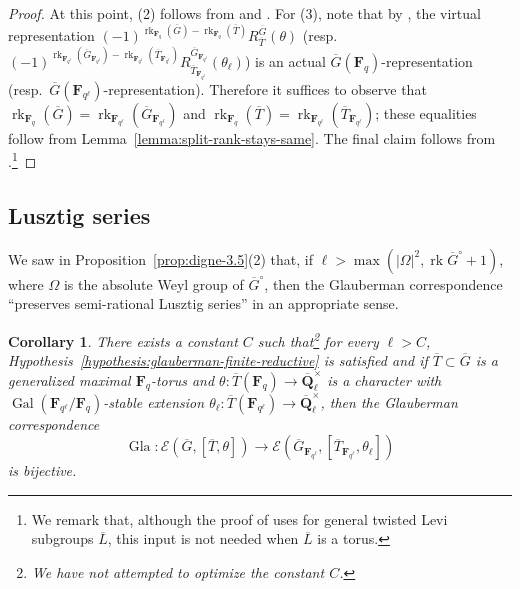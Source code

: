 \documentclass[reqno]{amsart}
\numberwithin{equation}{subsection}
\newcommand{\F}{\mathbf{F}}
\newcommand{\Q}{\mathbf{Q}}
\newcommand{\Gal}{\operatorname{Gal}}
\newcommand{\ol}[1]{\overline{#1}}
\newcommand{\co}{\colon}
\newcommand\cE{\mathcal{E}}
\DeclareMathOperator{\rk}{rk}
\DeclareMathOperator{\Gla}{Gla}
\newtheorem{cor}[thm]{Corollary}
\theoremstyle{remark}
\numberwithin{equation}{subsection}
\numberwithin{figure}{subsection}
\begin{document}
\begin{proof}
    At this point, (2) follows from \cite[Lemma 2.2]{Cot26a} and \cite[Corollaire 3.2]{Dig99}. For (3), note that by \cite[Proposition~7.4]{DL76}, the virtual representation $(-1)^{\rk_{\F_q}(\ol G) - \rk_{\F_q}(\ol T)}R_{\ol T}^{\ol G}(\theta)$ (resp.\ $(-1)^{\rk_{\F_{q^\ell}}(\ol G_{\F_{q^\ell}}) - \rk_{\F_{q^\ell}}(\ol T_{\F_{q^\ell}})} R_{\ol T_{\F_{q^\ell}}}^{\ol G_{\F_{q^\ell}}}(\theta_\ell)$) is an actual $\ol G(\F_q)$-representation (resp.\ $\ol G(\F_{q^\ell})$-representation). Therefore it suffices to observe that $\rk_{\F_q}(\ol G) = \rk_{\F_{q^\ell}}(\ol G_{\F_{q^\ell}})$ and $\rk_{\F_q}(\ol T) = \rk_{\F_{q^\ell}}(\ol T_{\F_{q^\ell}})$; these equalities follow from Lemma~\ref{lemma:split-rank-stays-same}. The final claim follows from \cite[Theorem 1.2]{Cot26a}.\footnote{We remark that, although the proof of \cite[Theorem 1.2]{Cot26a} uses \cite[Theorem~8.7.2]{GRV26} for general twisted Levi subgroups $\ol L$, this input is not needed when $\ol L$ is a torus.}
\end{proof}

\subsection{Lusztig series}\label{ssec:lusztig-series}

We saw in Proposition~\ref{prop:digne-3.5}(2) that, if $\ell > \max(|\Omega|^2, \rk \ol G^\circ + 1)$, where $\Omega$ is the absolute Weyl group of $\ol G^\circ$, then the Glauberman correspondence ``preserves semi-rational Lusztig series'' in an appropriate sense.

\begin{cor}\label{cor:glauberman-lusztig-bijection}
    There exists a constant $C$ such that\footnote{We have not attempted to optimize the constant $C$.} for every $\ell > C$, Hypothesis~\ref{hypothesis:glauberman-finite-reductive} is satisfied and if $\ol T \subset \ol G$ is a generalized maximal $\F_q$-torus and $\theta\co \ol T(\F_q) \to \ol\Q_\ell^\times$ is a character with $\Gal(\F_{q^\ell}/\F_q)$-stable extension $\theta_\ell\co \ol T(\F_{q^\ell}) \to \ol\Q_\ell^\times$, then the Glauberman correspondence
    \[
    \Gla\co \cE(\ol G, [\ol T, \theta]) \to \cE(\ol G_{\F_{q^\ell}}, [\ol T_{\F_{q^\ell}}, \theta_\ell])
    \]
    is bijective.
\end{cor}
\end{document}
